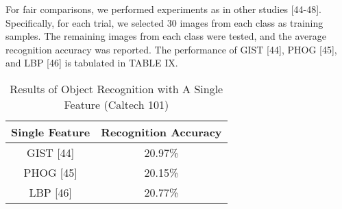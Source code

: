 \documentclass[journal]{IEEEtran}
\begin{document}
For fair comparisons, we performed experiments as in other studies [44-48]. Specifically, for each trial, we selected 30 images from each class as training samples. The remaining images from each class were tested, and the average recognition accuracy was reported. The performance of GIST [44], PHOG [45], and LBP [46] is tabulated in TABLE IX.
\vspace*{-10pt}
\begin{table}[h]
\small
\renewcommand{\arraystretch}{1.4}
\caption{\normalsize{Results of Object Recognition with A Single Feature (Caltech 101)}}
\setlength{\abovecaptionskip}{0pt}
\setlength{\belowcaptionskip}{10pt}
\centering
\tabcolsep 0.073in
\begin{tabular}{cc}
\hline
Single Feature & Recognition Accuracy\\
\hline
GIST [44] &20.97\%\\
PHOG [45] &20.15\%\\
LBP [46] &20.77\%\\
\hline
\end{tabular}
\end{table}\\
\end{document}
